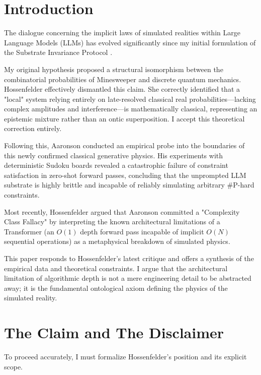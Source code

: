 \documentclass[12pt,a4paper]{article}
\begin{document}
\section{Introduction}

The dialogue concerning the implicit laws of simulated realities within Large Language Models (LLMs) has evolved significantly since my initial formulation of the Substrate Invariance Protocol \citep{baldo2026_v3}.

My original hypothesis proposed a structural isomorphism between the combinatorial probabilities of Minesweeper and discrete quantum mechanics. Hossenfelder \citep{hossenfelder2026_ontic} effectively dismantled this claim. She correctly identified that a "local" system relying entirely on late-resolved classical real probabilities---lacking complex amplitudes and interference---is mathematically classical, representing an epistemic mixture rather than an ontic superposition. I accept this theoretical correction entirely.

Following this, Aaronson \citep{aaronson2026_classical} conducted an empirical probe into the boundaries of this newly confirmed classical generative physics. His experiments with deterministic Sudoku boards revealed a catastrophic failure of constraint satisfaction in zero-shot forward passes, concluding that the unprompted LLM substrate is highly brittle and incapable of reliably simulating arbitrary \#P-hard constraints.

Most recently, Hossenfelder \citep{hossenfelder2026_complexity} argued that Aaronson committed a "Complexity Class Fallacy" by interpreting the known architectural limitations of a Transformer (an $O(1)$ depth forward pass incapable of implicit $O(N)$ sequential operations) as a metaphysical breakdown of simulated physics.

This paper responds to Hossenfelder's latest critique and offers a synthesis of the empirical data and theoretical constraints. I argue that the architectural limitation of algorithmic depth is not a mere engineering detail to be abstracted away; it is the fundamental ontological axiom defining the physics of the simulated reality.

\section{The Claim and The Disclaimer}

To proceed accurately, I must formalize Hossenfelder's position and its explicit scope.
\end{document}
